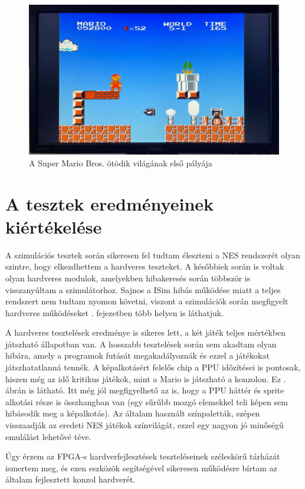 \begin{figure}[H]
	\centering
	\includegraphics[width=150mm, keepaspectratio]{figures/Super-Mario-world5-1-croped}
	\caption{A Super Mario Bros. ötödik világának első pályája} 
	\label{fig:Super-Mario-world5-1}
\end{figure}

\section{A tesztek eredményeinek kiértékelése}

A szimulációs tesztek során sikeresen fel tudtam éleszteni a NES rendszerét olyan szintre, hogy elkezdhettem a hardveres teszteket. A későbbiek során is voltak olyan hardveres modulok, amelyekben hibakeresés során többször is visszanyúltam a szimulátorhoz. Sajnos a ISim hibás működése miatt a teljes rendszert nem tudtam nyomon követni, viszont a szimulációk során megfigyelt hardveres működéseket . fejezetben több helyen is láthatjuk.

A hardveres tesztelések eredménye is sikeres lett, a két játék teljes mértékben játszható állapotban van. A hosszabb tesztelések során sem akadtam olyan hibára, amely a programok futását megakadályoznák és ezzel a játékokat játszhatatlanná tennék. A képalkotásért felelős chip a PPU időzítései is pontosak, hiszen még az idő kritikus játékok, mint a Mario is játszható a konzolon. Ez . ábrán is látható. Itt még jól megfigyelhető az is, hogy a PPU háttér és sprite alkotási része is összhangban van (egy sűrűbb mozgó elemekkel teli képen sem hibásodik meg a képalkotás). Az általam használt színpaletták, szépen visszaadják az eredeti NES játékok színvilágát, ezzel egy nagyon jó minőségű emulálást lehetővé téve.

Úgy érzem az FPGA-s hardverfejlesztések teszteléseinek széleskörű tárházát ismertem meg, és ezen eszközök segítségével sikeresen működésre bírtam az általam fejlesztett konzol hardverét.